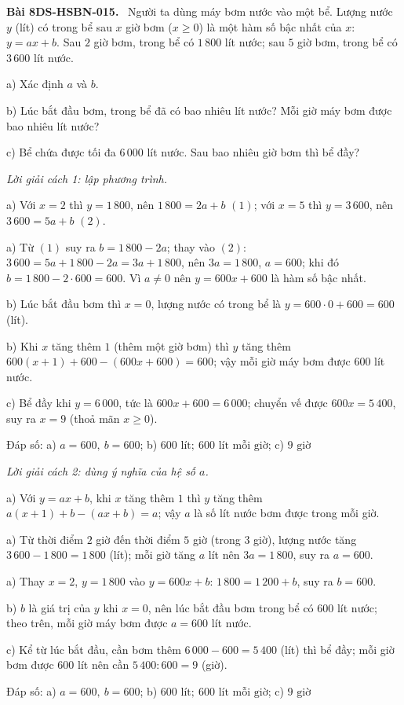 \documentclass[12pt,a4paper]{article}
\newenvironment{problem}[1][]{\par\medskip\noindent\textbf{Bài #1.}\ }{\par}
\newenvironment{solution}[1][]{\par\noindent\textit{Lời giải #1.}\par}{\par}
\begin{document}
\begin{problem}[8DS-HSBN-015]
Người ta dùng máy bơm nước vào một bể. Lượng nước $y$ (lít) có trong bể sau $x$ giờ bơm ($x \geq 0$) là một hàm số bậc nhất của $x$: $y = ax + b$. Sau $2$ giờ bơm, trong bể có $1\,800$ lít nước; sau $5$ giờ bơm, trong bể có $3\,600$ lít nước.

a) Xác định $a$ và $b$.

b) Lúc bắt đầu bơm, trong bể đã có bao nhiêu lít nước? Mỗi giờ máy bơm được bao nhiêu lít nước?

c) Bể chứa được tối đa $6\,000$ lít nước. Sau bao nhiêu giờ bơm thì bể đầy?

\begin{solution}[cách 1: lập phương trình]
a) Với $x = 2$ thì $y = 1\,800$, nên $1\,800 = 2a + b$ $(1)$; với $x = 5$ thì $y = 3\,600$, nên $3\,600 = 5a + b$ $(2)$.

a) Từ $(1)$ suy ra $b = 1\,800 - 2a$; thay vào $(2)$: $3\,600 = 5a + 1\,800 - 2a = 3a + 1\,800$, nên $3a = 1\,800$, $a = 600$; khi đó $b = 1\,800 - 2 \cdot 600 = 600$. Vì $a \neq 0$ nên $y = 600x + 600$ là hàm số bậc nhất.

b) Lúc bắt đầu bơm thì $x = 0$, lượng nước có trong bể là $y = 600 \cdot 0 + 600 = 600$ (lít).

b) Khi $x$ tăng thêm $1$ (thêm một giờ bơm) thì $y$ tăng thêm $600(x + 1) + 600 - (600x + 600) = 600$; vậy mỗi giờ máy bơm được $600$ lít nước.

c) Bể đầy khi $y = 6\,000$, tức là $600x + 600 = 6\,000$; chuyển vế được $600x = 5\,400$, suy ra $x = 9$ (thoả mãn $x \geq 0$).

Đáp số: a) $\boxed{a = 600,\ b = 600}$; b) $\boxed{600 \text{ lít};\ 600 \text{ lít mỗi giờ}}$; c) $\boxed{9 \text{ giờ}}$
\end{solution}

\begin{solution}[cách 2: dùng ý nghĩa của hệ số $a$]
a) Với $y = ax + b$, khi $x$ tăng thêm $1$ thì $y$ tăng thêm $a(x + 1) + b - (ax + b) = a$; vậy $a$ là số lít nước bơm được trong mỗi giờ.

a) Từ thời điểm $2$ giờ đến thời điểm $5$ giờ (trong $3$ giờ), lượng nước tăng $3\,600 - 1\,800 = 1\,800$ (lít); mỗi giờ tăng $a$ lít nên $3a = 1\,800$, suy ra $a = 600$.

a) Thay $x = 2$, $y = 1\,800$ vào $y = 600x + b$: $1\,800 = 1\,200 + b$, suy ra $b = 600$.

b) $b$ là giá trị của $y$ khi $x = 0$, nên lúc bắt đầu bơm trong bể có $600$ lít nước; theo trên, mỗi giờ máy bơm được $a = 600$ lít nước.

c) Kể từ lúc bắt đầu, cần bơm thêm $6\,000 - 600 = 5\,400$ (lít) thì bể đầy; mỗi giờ bơm được $600$ lít nên cần $5\,400 : 600 = 9$ (giờ).

Đáp số: a) $\boxed{a = 600,\ b = 600}$; b) $\boxed{600 \text{ lít};\ 600 \text{ lít mỗi giờ}}$; c) $\boxed{9 \text{ giờ}}$
\end{solution}
\end{problem}
\end{document}
